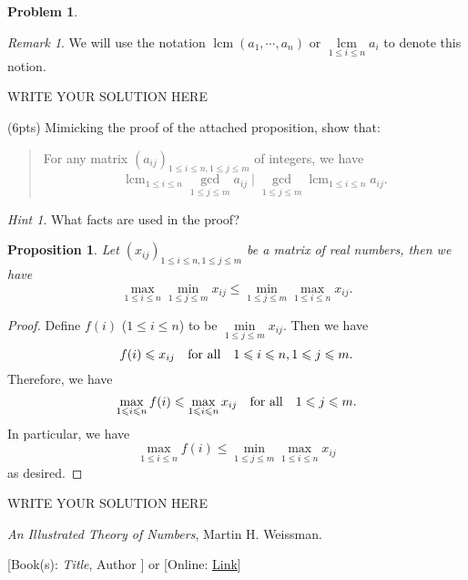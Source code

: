 \documentclass[11pt]{article}
\theoremstyle{plain}
\newtheorem*{propstar}{Proposition}
\theoremstyle{definition}
\newtheorem{problem}{Problem}
\theoremstyle{remark}
\newtheorem*{remark}{Remark}
\newtheorem*{hint}{Hint}
\numberwithin{equation}{problem}
\DeclareMathOperator*\lcm{lcm}
\begin{document}
\begin{problem}
\begin{listinprob}
		\begin{remark}
			We will use the notation $\lcm(a_1,\cdots,a_n)$ or $\lcm\limits_{1\le i\le n}a_i$ to denote this notion.
		\end{remark}

\begin{solution} %
WRITE YOUR SOLUTION HERE
\end{solution}\clearpage %

		\item (6pts) Mimicking the proof of the attached proposition, show that: 
		\begin{quote}
			For any matrix $(a_{ij})_{1\le i\le n, 1\le j\le m}$ of integers, we have 
			\[
				\lcm_{1\le i\le n}\gcd_{1\le j\le m} a_{ij} \mid 
				\gcd_{1\le j\le m}\lcm_{1\le i\le n} a_{ij}.
			\]
		\end{quote}
		\begin{hint}
			What facts are used in the proof?
		\end{hint}
	\end{listinprob}
	\begin{tcolorbox}
		\begin{propstar}\label{prop}
			Let $(x_{ij})_{1\le i\le n, 1\le j\le m}$ be a matrix of real numbers, then we have 
			\[
				\max_{1\le i\le n}\min_{1\le j\le m} x_{ij} \le 
				\min_{1\le j\le m}\max_{1\le i\le n} x_{ij}.
			\]
		\end{propstar}
		\begin{proof}
			Define $f(i)$ ($1\le i\le n$) to be $\min\limits_{1\le j\le m}x_{ij}$. Then we have 
			\[
				f(i) \leqslant x_{ij} \quad\text{for all}\quad 1\leqslant i\leqslant n, 1\leqslant j\leqslant m.
			\]
			Therefore, we have 
			\[
				\max_{1\leqslant i\leqslant n}f(i) \leqslant \max_{1\leqslant i\leqslant n} x_{ij} 
				\quad\text{for all}\quad 1\leqslant j\leqslant m.
			\]
			In particular, we have 
			\[
				\max_{1\le i\le n}f(i) \le \min_{1\le j\le m}\max_{1\le i\le n} x_{ij}
			\]
			as desired.
		\end{proof}
	\end{tcolorbox}
\end{problem}

\begin{solution} %
WRITE YOUR SOLUTION HERE
\end{solution}\clearpage %



\begin{thebibliography}{9}  %
\emph{An Illustrated Theory of Numbers}, Martin H. Weissman.

[Book(s): \emph{Title}, Author ] or [Online: \href{http://example.com/}{Link}]
\end{thebibliography}  %
\end{document}
